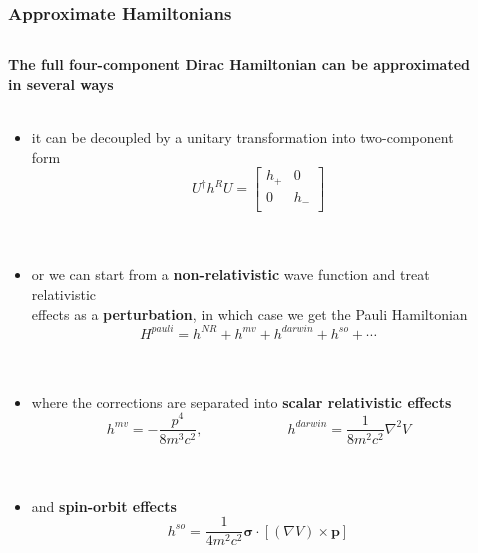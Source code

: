 \documentclass[mathserif,8pt]{beamer}
\begin{document}
\begin{frame}
    \frametitle{Approximate Hamiltonians}
    \begin{columns}
    \begin{column}{.75\textwidth}
    \textbf{The full four-component Dirac Hamiltonian can be approximated in several ways}\\
    \ \\
    \begin{itemize}
	\item	it can be decoupled by a unitary transformation into two-component form
		\begin{equation}
		    \nonumber
		    U^\dag h^RU = \begin{bmatrix}h_+&0\\0&h_-\\ \end{bmatrix}
		\end{equation}
		\ \\
		\ \\
	\item	or we can start from a \textbf{non-relativistic} wave function and treat relativistic\\
		effects as a \textbf{perturbation}, in which case we get the Pauli Hamiltonian
		\begin{equation}
		    \nonumber
		    H^{pauli} = h^{NR} + h^{mv} + h^{darwin} + h^{so} + \cdots
		\end{equation}
		\ \\
		\ \\
	\item	where the corrections are separated into \textbf{scalar relativistic effects}
		\begin{equation}
		    \nonumber
		    h^{mv} = -\frac{p^4}{8m^3c^2}, \qquad\qquad\qquad
		    h^{darwin} = \frac{1}{8m^2c^2} \nabla^2V
		\end{equation}
		\ \\
		\ \\
	\item	and \textbf{spin-orbit effects}
		\begin{equation}
		    \nonumber
		    h^{so} = \frac{1}{4m^2c^2}\boldsymbol{\sigma}\cdot
		    \left[\left(\nabla V\right)\times\boldsymbol{p}\right]
		\end{equation}
    \end{itemize}
    \end{column}
    \begin{column}{.25\textwidth}
	\ \\
    \end{column}
    \end{columns}
\end{frame}
\end{document}
